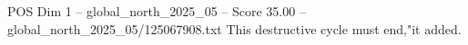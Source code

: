 \begin{textsample}{POS Dim 1 – global\_north\_2025\_05 – Score 35.00 – global\_north\_2025\_05/125067908.txt}
This destructive cycle must end,"it added.

\end{textsample}
